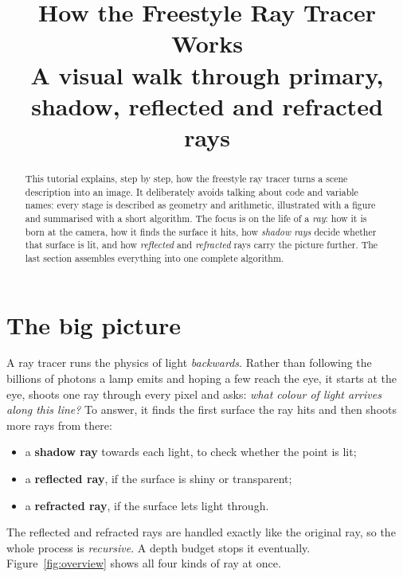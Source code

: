\documentclass[11pt,a4paper]{article}
\title{\textbf{How the Freestyle Ray Tracer Works}\\[4pt]
\large A visual walk through primary, shadow, reflected and refracted rays}
\author{}
\date{}
\begin{document}
\maketitle

\begin{abstract}
This tutorial explains, step by step, how the freestyle ray tracer turns a scene
description into an image. It deliberately avoids talking about code and
variable names: every stage is described as geometry and arithmetic, illustrated
with a figure and summarised with a short algorithm. The focus is on the life of
a \emph{ray}: how it is born at the camera, how it finds the surface it hits, how
\emph{shadow rays} decide whether that surface is lit, and how
\emph{reflected} and \emph{refracted} rays carry the picture further. The last
section assembles everything into one complete algorithm.
\end{abstract}

\tableofcontents
\newpage

\section{The big picture}

A ray tracer runs the physics of light \emph{backwards}. Rather than following
the billions of photons a lamp emits and hoping a few reach the eye, it starts at
the eye, shoots one ray through every pixel and asks: \emph{what colour of light
arrives along this line?} To answer, it finds the first surface the ray hits and
then shoots more rays from there:

\begin{itemize}[leftmargin=1.4em]
  \item a \textbf{shadow ray} towards each light, to check whether the point is lit;
  \item a \textbf{reflected ray}, if the surface is shiny or transparent;
  \item a \textbf{refracted ray}, if the surface lets light through.
\end{itemize}

The reflected and refracted rays are handled exactly like the original ray, so
the whole process is \emph{recursive}. A depth budget stops it eventually.
Figure~\ref{fig:overview} shows all four kinds of ray at once.
\end{document}

